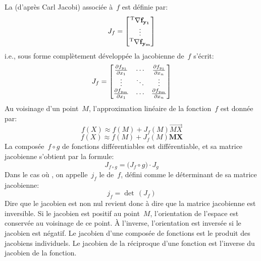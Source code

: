 \medskipvm\fi
La  (d'après Carl Jacobi) 
associée à~$f$ est définie par:
\begin{equation}
J_f = \MM*{\LL{\nabla f_{y_1}} \\ \vdots \\ \LL{\nabla f_{y_m}}}
\end{equation}
i.e., sous forme complètement développée la jacobienne de~$f$ s'écrit:
\begin{equation}
J_f = \MM*{\frac{\partial f_{y_1}}{\partial x_1} & \cdots & \frac{\partial f_{y_1}}{\partial x_n} \\ \vdots & \ddots & \vdots \\ \frac{\partial f_{y_m}}{\partial x_1} & \cdots & \frac{\partial f_{y_m}}{\partial x_n}}
\end{equation}
\medskipvm
Au voisinage d'un point~$M$, l'approximation linéaire de la fonction~$f$ est donnée par:
\ifVersionDuDocEstVincent
\begin{equation} f\left(X\right) \approx f\left(M\right) + J_f\left(M\right) \overrightarrow{MX}\end{equation}
\else
\begin{equation} f\left(X\right) \approx f\left(M\right) + J_f\left(M\right) \mathbf{MX}\end{equation}
\fi
\medskipvm
La composée~$f\circ g$ de fonctions différentiables est différentiable, et sa matrice jacobienne 
s'obtient par la formule:
\begin{equation} J_{f \circ g}= \bigl( J_f \circ g \bigr) \cdot J_g\end{equation}
\medskipvm
Dans le cas où , on appelle~$j_f$ le  de~$f$, 
défini comme le déterminant de sa matrice jacobienne: 
\begin{equation} j_f = \det\, \left(J_f \right) \end{equation}
Dire que le jacobien est non nul revient donc à dire que la matrice jacobienne est inversible.
\medskipvm
Si le jacobien est positif au point~$M$, l'orientation de l'espace est conservée au voisinage de ce point. 
À l'inverse, l'orientation est inversée si le jacobien est négatif.
\medskipvm
Le jacobien d'une composée de fonctions est le produit des jacobiens individuels.
\medskipvm
Le jacobien de la réciproque d'une fonction est l'inverse du jacobien de la fonction.
